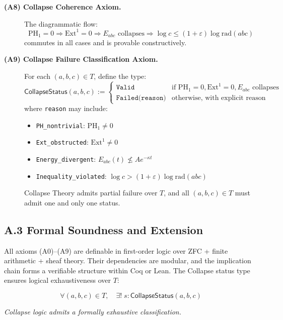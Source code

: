 \documentclass[11pt]{article}
\begin{document}
\begin{description}
  \item[\textbf{(A8) Collapse Coherence Axiom.}]  
  The diagrammatic flow:
  \[
  \mathrm{PH}_1 = 0 \Rightarrow \mathrm{Ext}^1 = 0 \Rightarrow E_{abc} \text{ collapses} \Rightarrow \log c \leq (1+\varepsilon) \log \mathrm{rad}(abc)
  \]
  commutes in all cases and is provable constructively.

  \item[\textbf{(A9) Collapse Failure Classification Axiom.}]  
  For each \( (a,b,c) \in T \), define the type:
  \[
  \mathsf{CollapseStatus}(a,b,c) := 
  \begin{cases}
    \texttt{Valid} & \text{if } \mathrm{PH}_1 = 0, \mathrm{Ext}^1 = 0, E_{abc} \text{ collapses} \\
    \texttt{Failed(reason)} & \text{otherwise, with explicit reason}
  \end{cases}
  \]
  where \texttt{reason} may include:
  \begin{itemize}
    \item \texttt{PH\_nontrivial}: \( \mathrm{PH}_1 \neq 0 \)
    \item \texttt{Ext\_obstructed}: \( \mathrm{Ext}^1 \neq 0 \)
    \item \texttt{Energy\_divergent}: \( E_{abc}(t) \not\leq A e^{-\kappa t} \)
    \item \texttt{Inequality\_violated}: \( \log c > (1+\varepsilon)\log \mathrm{rad}(abc) \)
  \end{itemize}
  Collapse Theory admits partial failure over \( T \), and all \( (a,b,c) \in T \) must admit one and only one status.

\end{description}

\subsection*{A.3 Formal Soundness and Extension}

All axioms (A0)–(A9) are definable in first-order logic over ZFC + finite arithmetic + sheaf theory.  
Their dependencies are modular, and the implication chain forms a verifiable structure within Coq or Lean.  
The Collapse status type ensures logical exhaustiveness over \( T \):

\[
\forall (a,b,c) \in T,\quad \exists! \; s : \mathsf{CollapseStatus}(a,b,c)
\]

\begin{center}
    \textit{Collapse logic admits a formally exhaustive classification.}
\end{center}
\end{document}
